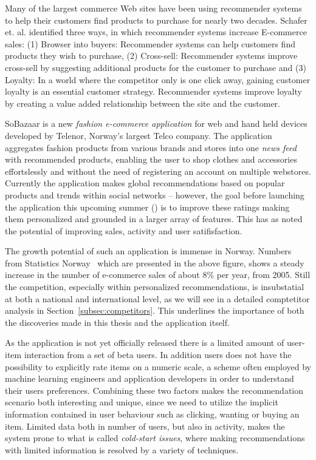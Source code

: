 Many of the largest commerce Web sites have been using recommender systems to
help their customers find products to purchase for nearly two decades.
Schafer et. al. \cite{Schafer1999} identified three ways, in which recommender
systems increase E-commerce sales: (1) Browser into buyers: Recommender systems
can help customers find products they wish to purchase, (2) Cross-sell:
Recommender systems improve cross-sell by suggesting additional products for
the customer to purchase and (3) Loyalty: In a world where the competitor only
is one click away, gaining customer loyalty is an essential customer strategy.
Recommender systems improve loyalty by creating a value added relationship
between the site and the customer.

SoBazaar is a new \textit{fashion e-commerce application} for web and hand held
devices developed by Telenor, Norway's largest Telco company. The application
aggregates fashion products from various brands and stores into one \emph{news
feed} with recommended products, enabling the user to shop clothes and
accessories effortslessly and without the need of registering an account on
multiple webstores. Currently the application makes global recommendations
based on popular products and trends within social networks – however, the goal
before launching the application this upcoming summer (\the\year) is to improve
these ratings making them personalized and grounded in a larger array of
features. This has as noted the potential of improving sales, activity and user
satifisfaction.

\ecommercenorway{}

The growth potential of such an application is immense in Norway. Numbers from
Statistics Norway~\cite{statisticsNorway} which are presented in the above
figure, shows a steady increase in the number of e-commerce sales of about 8\%
per year, from 2005. Still the competition, especially within personalized
recommendations, is insubstatial at both a national and international level, as
we will see in a detailed comptetitor analysis in
Section~\ref{subsec:competitors}. This underlines the importance of both the
discoveries made in this thesis and the application itself.

As the application is not yet officially released there is a limited amount of
user-item interaction from a set of beta users. In addition users does not have
the possibility to explicitly rate items on a numeric scale, a scheme often
employed by machine learning engineers and application developers in order to
understand their users preferences. Combining these two factors makes the
recommendation scenario both interesting and unique, since we need to utilize
the implicit information contained in user behaviour such as clicking, wanting
or buying an item. Limited data both in number of users, but also in activity,
makes the system prone to what is called \textit{cold-start issues}, where
making recommendations with limited information is resolved by a variety of
techniques.


